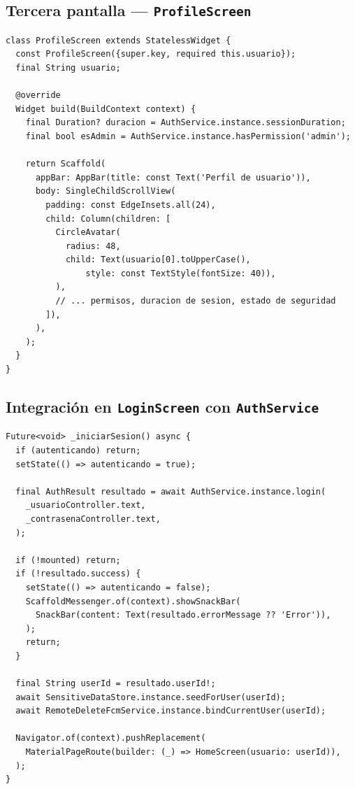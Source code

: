 \documentclass[12pt,a4paper]{article}
\begin{document}
\subsection{Tercera pantalla — \texttt{ProfileScreen}}

\begin{lstlisting}[style=dart, caption={lib/profile\_screen.dart (fragmento)}]
class ProfileScreen extends StatelessWidget {
  const ProfileScreen({super.key, required this.usuario});
  final String usuario;

  @override
  Widget build(BuildContext context) {
    final Duration? duracion = AuthService.instance.sessionDuration;
    final bool esAdmin = AuthService.instance.hasPermission('admin');

    return Scaffold(
      appBar: AppBar(title: const Text('Perfil de usuario')),
      body: SingleChildScrollView(
        padding: const EdgeInsets.all(24),
        child: Column(children: [
          CircleAvatar(
            radius: 48,
            child: Text(usuario[0].toUpperCase(),
                style: const TextStyle(fontSize: 40)),
          ),
          // ... permisos, duracion de sesion, estado de seguridad
        ]),
      ),
    );
  }
}
\end{lstlisting}

\subsection{Integración en \texttt{LoginScreen} con \texttt{AuthService}}

\begin{lstlisting}[style=dart, caption={lib/main.dart — método \_iniciarSesion()}]
Future<void> _iniciarSesion() async {
  if (autenticando) return;
  setState(() => autenticando = true);

  final AuthResult resultado = await AuthService.instance.login(
    _usuarioController.text,
    _contrasenaController.text,
  );

  if (!mounted) return;
  if (!resultado.success) {
    setState(() => autenticando = false);
    ScaffoldMessenger.of(context).showSnackBar(
      SnackBar(content: Text(resultado.errorMessage ?? 'Error')),
    );
    return;
  }

  final String userId = resultado.userId!;
  await SensitiveDataStore.instance.seedForUser(userId);
  await RemoteDeleteFcmService.instance.bindCurrentUser(userId);

  Navigator.of(context).pushReplacement(
    MaterialPageRoute(builder: (_) => HomeScreen(usuario: userId)),
  );
}
\end{lstlisting}
\end{document}
